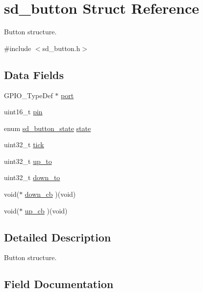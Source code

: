 \hypertarget{structsd__button}{}\section{sd\+\_\+button Struct Reference}
\label{structsd__button}


Button structure.  




{\ttfamily \#include $<$sd\+\_\+button.\+h$>$}

\subsection*{Data Fields}
\begin{DoxyCompactItemize}
\item 
G\+P\+I\+O\+\_\+\+Type\+Def $\ast$ \mbox{\hyperlink{structsd__button_a82241972e0292c7de95ea1e293e11be3}{port}}
\item 
uint16\+\_\+t \mbox{\hyperlink{structsd__button_a4144813adfa4dfe7e7cbeea17d1b06eb}{pin}}
\item 
enum \mbox{\hyperlink{group___s_d___button___types_gad961a8af755b135c7e69a304d4f6303c}{sd\+\_\+button\+\_\+state}} \mbox{\hyperlink{structsd__button_ade8bc1d49a12e01bd732b12c411b9861}{state}}
\item 
uint32\+\_\+t \mbox{\hyperlink{structsd__button_a260e06ce96c2e4deebccaedeb059dc0b}{tick}}
\item 
uint32\+\_\+t \mbox{\hyperlink{structsd__button_a92e85c4fc2f84cfa9fbed1fd60a7fac7}{up\+\_\+to}}
\item 
uint32\+\_\+t \mbox{\hyperlink{structsd__button_a3a9f2a46d68b7d2da0fafa3f2ddbdfb1}{down\+\_\+to}}
\item 
void($\ast$ \mbox{\hyperlink{structsd__button_ab831af9861aafa479d1245fb2a3633fc}{down\+\_\+cb}} )(void)
\item 
void($\ast$ \mbox{\hyperlink{structsd__button_afc4472a8d74ec3156eae7b77bf8a256c}{up\+\_\+cb}} )(void)
\end{DoxyCompactItemize}


\subsection{Detailed Description}
Button structure. 

\subsection{Field Documentation}
\mbox{\label{structsd__button_ab831af9861aafa479d1245fb2a3633fc}} 
